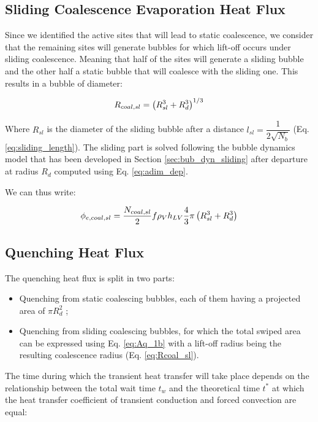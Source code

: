 \subsection{Sliding Coalescence Evaporation Heat Flux}

Since we identified the active sites that will lead to static coalescence, we consider that the remaining sites will generate bubbles for which lift-off occurs under sliding coalescence. Meaning that half of the sites will generate a sliding bubble and the other half a static bubble that will coalesce with the sliding one. This results in a bubble of diameter:

\begin{equation}
R_{coal,sl} = \left( R_{sl}^{3}+R_{d}^{3} \right)^{1/3}
\label{eq:Rcoal_sl}
\end{equation}

Where $R_{sl}$ is the diameter of the sliding bubble after a distance $l_{sl} = \dfrac{1}{2\sqrt{N_{b}}}$ (Eq. \ref{eq:sliding_length}). The sliding part is solved following the bubble dynamics model that has been developed in Section \ref{sec:bub_dyn_sliding} after departure at radius $R_{d}$ computed using Eq. \ref{eq:adim_dep}.

\npar

We can thus write:

\begin{equation}
\phi_{e,coal,sl} = \frac{N_{coal,sl}}{2}f \rho_{V} h_{LV} \frac{4}{3} \pi \left( R_{sl}^{3} + R_{d}^{3} \right)
\end{equation}

\subsection{Quenching Heat Flux}

The quenching heat flux is split in two parts:

\begin{itemize}
\item Quenching from static coalescing bubbles, each of them having a projected area of $\pi R_{d}^{2}$ ;
\item Quenching from sliding coalescing bubbles, for which the total swiped area can be expressed using Eq. \ref{eq:Aq_1b} with a lift-off radius being the resulting coalescence radius (Eq. \ref{eq:Rcoal_sl}).
\end{itemize}


The time during which the transient heat transfer will take place depends on the relationship between the total wait time $t_{w}$ and the theoretical time $t^{*}$ at which the heat transfer coefficient of transient conduction and forced convection are equal:

